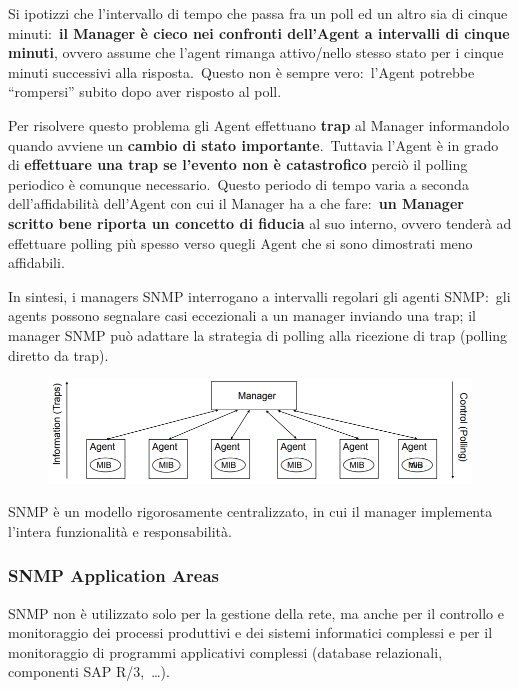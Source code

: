 Si ipotizzi che l'intervallo di tempo che passa fra un poll ed un altro sia di cinque minuti:\ \textbf{il Manager è cieco nei confronti dell'Agent a intervalli di cinque minuti}, ovvero assume che l'agent rimanga attivo/nello stesso stato per i cinque minuti successivi alla risposta.\
Questo non è sempre vero:\ l'Agent potrebbe ``rompersi'' subito dopo aver risposto al poll.\

Per risolvere questo problema gli Agent effettuano \textbf{trap} al Manager informandolo quando avviene un \textbf{cambio di stato importante}.\
Tuttavia l'Agent è in grado di \textbf{effettuare una trap se l'evento non è catastrofico} perciò il polling periodico è comunque necessario.\
Questo periodo di tempo varia a seconda dell'affidabilità dell'Agent con cui il Manager ha a che fare:\ \textbf{un Manager scritto bene riporta un concetto di fiducia} al suo interno, ovvero tenderà ad effettuare polling più spesso verso quegli Agent che si sono dimostrati meno affidabili.

In sintesi, i managers SNMP interrogano a intervalli regolari gli agenti SNMP:\ gli agents possono segnalare casi eccezionali a un manager inviando una trap; il manager SNMP può adattare la strategia di polling alla ricezione di trap (polling diretto da trap).

\begin{figure}[H]
    \centering
    \includegraphics[width=\textwidth]{immagini/Trap_direct_polling.png}
\end{figure}

\noindent SNMP è un modello rigorosamente centralizzato, in cui il manager implementa l'intera funzionalità e responsabilità.

\subsubsection{SNMP Application Areas}

SNMP non è utilizzato solo per la gestione della rete, ma anche per il controllo e monitoraggio dei processi produttivi e dei sistemi informatici complessi e per il monitoraggio di programmi applicativi complessi (database relazionali, componenti SAP R{\slash}3,\ \dots).\

